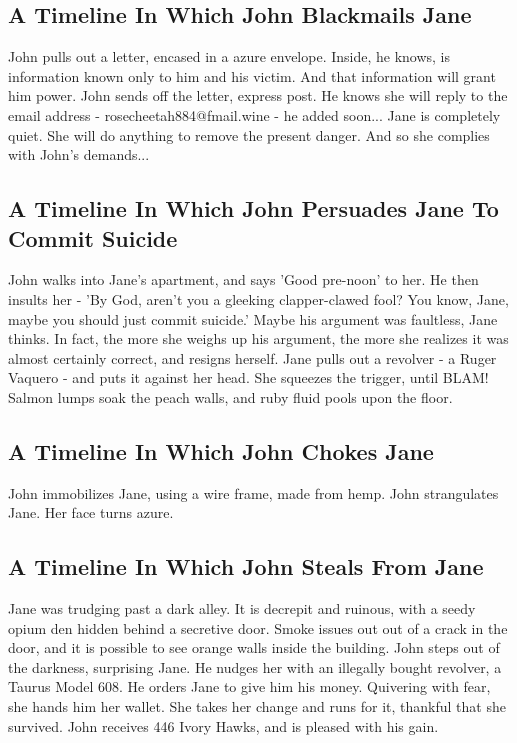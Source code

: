 \documentclass{article}
\begin{document}
\subsection{A Timeline In Which John Blackmails Jane}


John pulls out a letter, encased in a azure envelope. Inside, he knows, is information known only to him and his victim. And that information will grant him power.
John sends off the letter, express post. He knows she will reply to the email address {-} rosecheetah884@fmail.wine {-} he added soon...
Jane is completely quiet. She will do anything to remove the present danger. And so she complies with John's demands...
\subsection{A Timeline In Which John Persuades Jane To Commit Suicide}


John walks into Jane's apartment, and says 'Good pre{-}noon' to her.
He then insults her {-} 'By God, aren't you a gleeking clapper{-}clawed fool?
You know, Jane, maybe you should just commit suicide.'
Maybe his argument was faultless, Jane thinks.
In fact, the more she weighs up his argument, the more she realizes it was almost certainly correct, and resigns herself.
Jane pulls out a revolver {-} a Ruger Vaquero {-} and puts it against her head.
She squeezes the trigger, until BLAM!
Salmon lumps soak the peach walls, and ruby fluid pools upon the floor.
\subsection{A Timeline In Which John Chokes Jane}


John immobilizes Jane, using a wire frame, made from hemp.
John strangulates Jane.
Her face turns azure.
\subsection{A Timeline In Which John Steals From Jane}


Jane was trudging past a dark alley.
It is decrepit and ruinous, with a seedy opium den hidden behind a secretive door.
Smoke issues out out of a crack in the door, and it is possible to see orange walls inside the building.
John steps out of the darkness, surprising Jane.
He nudges her with an illegally bought revolver, a Taurus Model 608.
He orders Jane to give him his money.
Quivering with fear, she hands him her wallet.
She takes her change and runs for it, thankful that she survived.
John receives 446 Ivory Hawks, and is pleased with his gain.
\end{document}
